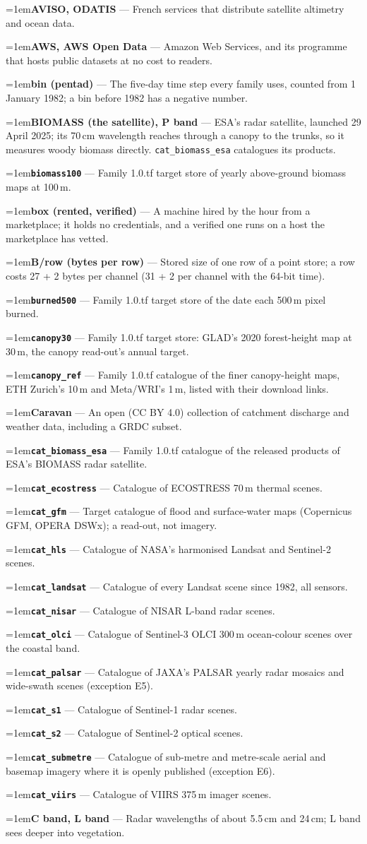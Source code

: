 \documentclass[10pt]{article}
\newcommand{\code}[1]{\texttt{#1}}
\newcommand{\gl}[2]{\par\hangindent=1em\hangafter=1\textbf{#1} --- #2\par}
\begin{document}
\gl{AVISO, ODATIS}{French services that distribute satellite altimetry and ocean data.}
\gl{AWS, AWS Open Data}{Amazon Web Services, and its programme that hosts public datasets at no cost to readers.}
\gl{bin (pentad)}{The five-day time step every family uses, counted from 1 January 1982; a bin before 1982 has a negative number.}
\gl{BIOMASS (the satellite), P band}{ESA's radar satellite, launched 29 April 2025; its 70\,cm wavelength reaches through a canopy to the trunks, so it measures woody biomass directly. \code{cat\_biomass\_esa} catalogues its products.}
\gl{\code{biomass100}}{Family 1.0.tf target store of yearly above-ground biomass maps at 100\,m.}
\gl{box (rented, verified)}{A machine hired by the hour from a marketplace; it holds no credentials, and a verified one runs on a host the marketplace has vetted.}
\gl{B/row (bytes per row)}{Stored size of one row of a point store; a row costs 27 + 2 bytes per channel (31 + 2 per channel with the 64-bit time).}
\gl{\code{burned500}}{Family 1.0.tf target store of the date each 500\,m pixel burned.}
\gl{\code{canopy30}}{Family 1.0.tf target store: GLAD's 2020 forest-height map at 30\,m, the canopy read-out's annual target.}
\gl{\code{canopy\_ref}}{Family 1.0.tf catalogue of the finer canopy-height maps, ETH Zurich's 10\,m and Meta/WRI's 1\,m, listed with their download links.}
\gl{Caravan}{An open (CC BY 4.0) collection of catchment discharge and weather data, including a GRDC subset.}
\gl{\code{cat\_biomass\_esa}}{Family 1.0.tf catalogue of the released products of ESA's BIOMASS radar satellite.}
\gl{\code{cat\_ecostress}}{Catalogue of ECOSTRESS 70\,m thermal scenes.}
\gl{\code{cat\_gfm}}{Target catalogue of flood and surface-water maps (Copernicus GFM, OPERA DSWx); a read-out, not imagery.}
\gl{\code{cat\_hls}}{Catalogue of NASA's harmonised Landsat and Sentinel-2 scenes.}
\gl{\code{cat\_landsat}}{Catalogue of every Landsat scene since 1982, all sensors.}
\gl{\code{cat\_nisar}}{Catalogue of NISAR L-band radar scenes.}
\gl{\code{cat\_olci}}{Catalogue of Sentinel-3 OLCI 300\,m ocean-colour scenes over the coastal band.}
\gl{\code{cat\_palsar}}{Catalogue of JAXA's PALSAR yearly radar mosaics and wide-swath scenes (exception E5).}
\gl{\code{cat\_s1}}{Catalogue of Sentinel-1 radar scenes.}
\gl{\code{cat\_s2}}{Catalogue of Sentinel-2 optical scenes.}
\gl{\code{cat\_submetre}}{Catalogue of sub-metre and metre-scale aerial and basemap imagery where it is openly published (exception E6).}
\gl{\code{cat\_viirs}}{Catalogue of VIIRS 375\,m imager scenes.}
\gl{C band, L band}{Radar wavelengths of about 5.5\,cm and 24\,cm; L band sees deeper into vegetation.}
\end{document}

